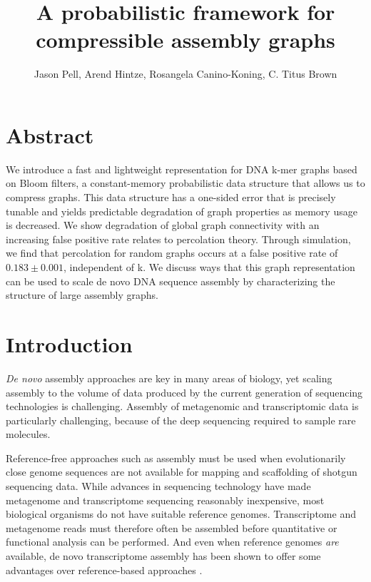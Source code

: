 \documentclass[12pt]{article} \usepackage{simplemargins}
\begin{document}
\title{A probabilistic framework for compressible assembly graphs}
\author{Jason Pell, Arend Hintze, Rosangela Canino-Koning, C. Titus Brown}

\maketitle

\section{Abstract}

We introduce a fast and lightweight representation for DNA k-mer graphs
based on Bloom filters, a constant-memory probabilistic data structure that allows us
to compress graphs.  This data structure has a one-sided
error that is precisely tunable and yields predictable degradation of
graph properties as memory usage is decreased. We show degradation of global 
graph connectivity with an increasing false
positive rate relates to percolation theory. Through 
simulation, we find that percolation for random graphs occurs at a false positive rate 
of $0.183 \pm 0.001$, independent of k. We discuss ways that this
graph representation can be used to scale de novo DNA sequence assembly by characterizing the structure of
large assembly graphs.

\section{Introduction}





























{\em De novo} assembly approaches are key in many areas of biology,
yet scaling assembly to the volume of data produced by the current
generation of sequencing technologies is challenging.  Assembly of
metagenomic and transcriptomic data is particularly challenging,
because of the deep sequencing required to sample rare molecules.

Reference-free approaches such as assembly must be used when
evolutionarily close genome sequences are not available for mapping
and scaffolding of shotgun sequencing data.  While advances in
sequencing technology have made metagenome and transcriptome
sequencing reasonably inexpensive, most biological organisms do not
have suitable reference genomes.  Transcriptome and metagenome reads
must therefore often be assembled before quantitative or functional
analysis can be performed.  And even when reference genomes {\em
  are} available, de novo transcriptome assembly has been shown to
offer some advantages over reference-based approaches \cite{trinity}.
\end{document}
